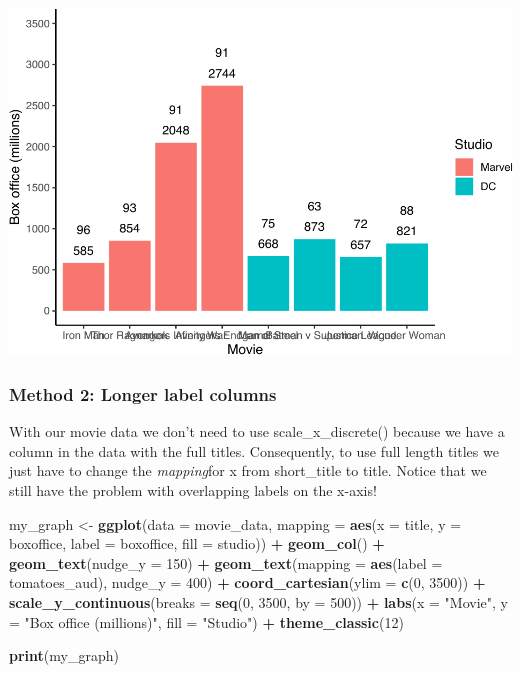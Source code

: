 \documentclass[
]{krantz}
\makeatletter
\newenvironment{Shaded}{\begin{snugshade}}{\end{snugshade}}
\newcommand{\DataTypeTok}[1]{\textcolor[rgb]{0.27,0.27,0.27}{#1}}
\newcommand{\DecValTok}[1]{\textcolor[rgb]{0.06,0.06,0.06}{#1}}
\newcommand{\KeywordTok}[1]{\textcolor[rgb]{0.27,0.27,0.27}{\textbf{#1}}}
\newcommand{\NormalTok}[1]{#1}
\newcommand{\OperatorTok}[1]{\textcolor[rgb]{0.43,0.43,0.43}{\textbf{#1}}}
\newcommand{\StringTok}[1]{\textcolor[rgb]{0.5,0.5,0.5}{#1}}
\newenvironment{kframe}{%
\medskip{}
\setlength{\fboxsep}{.8em}
 \def\at@end@of@kframe{}%
 \ifinner\ifhmode%
  \def\at@end@of@kframe{\end{minipage}}%
  \begin{minipage}{\columnwidth}%
 \fi\fi%
 \def\FrameCommand##1{\hskip\@totalleftmargin \hskip-\fboxsep
 \colorbox{shadecolor}{##1}\hskip-\fboxsep
     \hskip-\linewidth \hskip-\@totalleftmargin \hskip\columnwidth}%
 \MakeFramed {\advance\hsize-\width
   \@totalleftmargin\z@ \linewidth\hsize
   \@setminipage}}%
 {\par\unskip\endMakeFramed%
 \at@end@of@kframe}
\renewenvironment{Shaded}{\begin{kframe}}{\end{kframe}}
\makeatother
\begin{document}
\includegraphics[width=0.65\linewidth]{bookdown_files/figure-latex/unnamed-chunk-275-1}

\hypertarget{method-2-longer-label-columns}{%
\subsubsection{Method 2: Longer label columns}\label{method-2-longer-label-columns}}

With our movie data we don't need to use scale\_x\_discrete() because we have a column in the data with the full titles. Consequently, to use full length titles we just have to change the \emph{mapping}for x from short\_title to title. Notice that we still have the problem with overlapping labels on the x-axis!

\begin{Shaded}
\begin{Highlighting}[]
\NormalTok{my_graph <-}\StringTok{ }\KeywordTok{ggplot}\NormalTok{(}\DataTypeTok{data =}\NormalTok{ movie_data,}
           \DataTypeTok{mapping =} \KeywordTok{aes}\NormalTok{(}\DataTypeTok{x =}\NormalTok{ title,}
                         \DataTypeTok{y =}\NormalTok{ boxoffice,}
                         \DataTypeTok{label =}\NormalTok{ boxoffice, }
                         \DataTypeTok{fill =}\NormalTok{ studio)) }\OperatorTok{+}
\StringTok{  }\KeywordTok{geom_col}\NormalTok{() }\OperatorTok{+}
\StringTok{  }\KeywordTok{geom_text}\NormalTok{(}\DataTypeTok{nudge_y =} \DecValTok{150}\NormalTok{)  }\OperatorTok{+}
\StringTok{  }\KeywordTok{geom_text}\NormalTok{(}\DataTypeTok{mapping =} \KeywordTok{aes}\NormalTok{(}\DataTypeTok{label =}\NormalTok{ tomatoes_aud), }
            \DataTypeTok{nudge_y =} \DecValTok{400}\NormalTok{) }\OperatorTok{+}
\StringTok{  }\KeywordTok{coord_cartesian}\NormalTok{(}\DataTypeTok{ylim =} \KeywordTok{c}\NormalTok{(}\DecValTok{0}\NormalTok{, }\DecValTok{3500}\NormalTok{)) }\OperatorTok{+}
\StringTok{  }\KeywordTok{scale_y_continuous}\NormalTok{(}\DataTypeTok{breaks =} \KeywordTok{seq}\NormalTok{(}\DecValTok{0}\NormalTok{, }\DecValTok{3500}\NormalTok{, }\DataTypeTok{by =} \DecValTok{500}\NormalTok{)) }\OperatorTok{+}
\StringTok{  }\KeywordTok{labs}\NormalTok{(}\DataTypeTok{x =} \StringTok{"Movie"}\NormalTok{,}
       \DataTypeTok{y =} \StringTok{"Box office (millions)"}\NormalTok{,}
       \DataTypeTok{fill =} \StringTok{"Studio"}\NormalTok{) }\OperatorTok{+}
\StringTok{  }\KeywordTok{theme_classic}\NormalTok{(}\DecValTok{12}\NormalTok{)}
  

\KeywordTok{print}\NormalTok{(my_graph)}
\end{Highlighting}
\end{Shaded}
\end{document}
